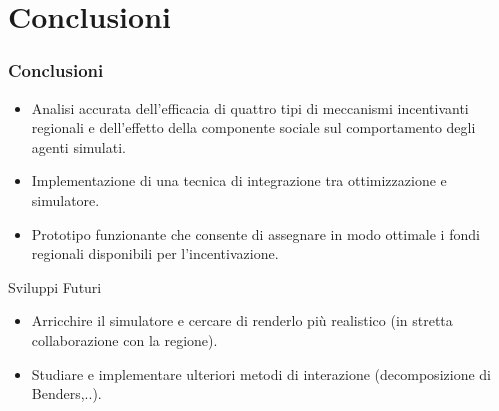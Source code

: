 \documentclass{beamer}
\begin{document}
\section{Conclusioni}
	\begin{frame}
		\frametitle{Conclusioni}
		\begin{alertblock}{}
			\begin{itemize}
				\item[\checkmark] Analisi accurata dell'efficacia di quattro tipi di meccanismi incentivanti regionali e dell'effetto della componente sociale sul comportamento degli agenti simulati.
				\item[\checkmark] Implementazione di una tecnica di integrazione tra ottimizzazione e simulatore.
				\item[\checkmark] Prototipo funzionante che consente di assegnare in modo ottimale i fondi regionali disponibili per l'incentivazione.
			\end{itemize}
		\end{alertblock}
		\begin{block}{Sviluppi Futuri}
			\begin{itemize}
				\item Arricchire il simulatore e cercare di renderlo più realistico (in stretta collaborazione con la regione).
				\item Studiare e implementare ulteriori metodi di interazione (decomposizione di Benders,..).
			\end{itemize}
		\end{block}
	\end{frame}
  
\end{document}
